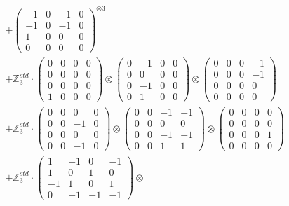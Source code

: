 \documentclass{article}
\begin{document}
{\begin{align}
        &+ \label{Rs16-Rc11-Solution-12-c16} \begin{pmatrix} -1 & 0 & -1 & 0 \\ -1 & 0 & -1 & 0 \\ 1 & 0 & 0 & 0 \\ 0 & 0 & 0 & 0 \end{pmatrix}^{\otimes 3} \\
        &+ \label{Rs16-Rc11-Solution-12-c17} \mathbb{Z}_3^{std} \cdot 
            \begin{pmatrix} 0 & 0 & 0 & 0 \\ 0 & 0 & 0 & 0 \\ 0 & 0 & 0 & 0 \\ 1 & 0 & 0 & 0 \end{pmatrix} \otimes 
            \begin{pmatrix} 0 & -1 & 0 & 0 \\ 0 & 0 & 0 & 0 \\ 0 & -1 & 0 & 0 \\ 0 & 1 & 0 & 0 \end{pmatrix} \otimes 
            \begin{pmatrix} 0 & 0 & 0 & -1 \\ 0 & 0 & 0 & -1 \\ 0 & 0 & 0 & 0 \\ 0 & 0 & 0 & 0 \end{pmatrix} \\ 
        &+ \label{Rs16-Rc11-Solution-12-c18} \mathbb{Z}_3^{std} \cdot 
            \begin{pmatrix} 0 & 0 & 0 & 0 \\ 0 & 0 & -1 & 0 \\ 0 & 0 & 0 & 0 \\ 0 & 0 & -1 & 0 \end{pmatrix} \otimes 
            \begin{pmatrix} 0 & 0 & -1 & -1 \\ 0 & 0 & 0 & 0 \\ 0 & 0 & -1 & -1 \\ 0 & 0 & 1 & 1 \end{pmatrix} \otimes 
            \begin{pmatrix} 0 & 0 & 0 & 0 \\ 0 & 0 & 0 & 0 \\ 0 & 0 & 0 & 1 \\ 0 & 0 & 0 & 0 \end{pmatrix} \\ 
        &+ \label{Rs16-Rc11-Solution-12-c19} \mathbb{Z}_3^{std} \cdot 
            \begin{pmatrix} 1 & -1 & 0 & -1 \\ 1 & 0 & 1 & 0 \\ -1 & 1 & 0 & 1 \\ 0 & -1 & -1 & -1 \end{pmatrix} \otimes 

\end{align}}
\end{document}
